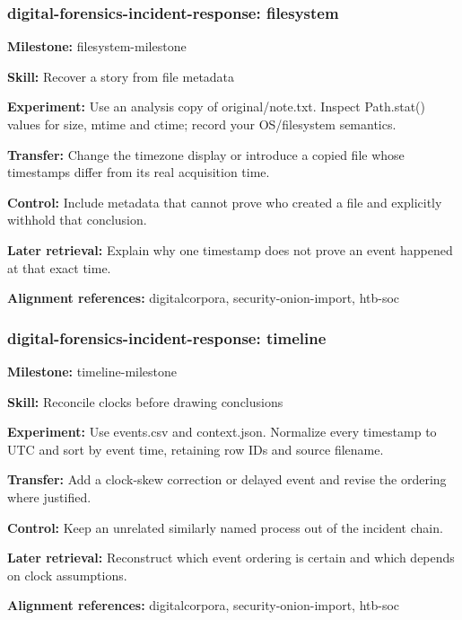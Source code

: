 \subsubsection{digital-forensics-incident-response: filesystem}
\noindent\textbf{Milestone:} filesystem-milestone\par
\noindent\textbf{Skill:} Recover a story from file metadata\par
\noindent\textbf{Experiment:} Use an analysis copy of original/note.txt. Inspect Path.stat() values for size, mtime and ctime; record your OS/filesystem semantics.\par
\noindent\textbf{Transfer:} Change the timezone display or introduce a copied file whose timestamps differ from its real acquisition time.\par
\noindent\textbf{Control:} Include metadata that cannot prove who created a file and explicitly withhold that conclusion.\par
\noindent\textbf{Later retrieval:} Explain why one timestamp does not prove an event happened at that exact time.\par
\noindent\textbf{Alignment references:} digitalcorpora, security-onion-import, htb-soc\par
\subsubsection{digital-forensics-incident-response: timeline}
\noindent\textbf{Milestone:} timeline-milestone\par
\noindent\textbf{Skill:} Reconcile clocks before drawing conclusions\par
\noindent\textbf{Experiment:} Use events.csv and context.json. Normalize every timestamp to UTC and sort by event time, retaining row IDs and source filename.\par
\noindent\textbf{Transfer:} Add a clock-skew correction or delayed event and revise the ordering where justified.\par
\noindent\textbf{Control:} Keep an unrelated similarly named process out of the incident chain.\par
\noindent\textbf{Later retrieval:} Reconstruct which event ordering is certain and which depends on clock assumptions.\par
\noindent\textbf{Alignment references:} digitalcorpora, security-onion-import, htb-soc\par

